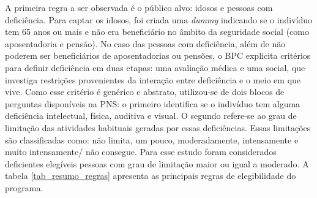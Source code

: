 \documentclass[
	12pt,				%
	openright,			%
	twoside,			%
	a4paper,			%
	english,			%
	french,				%
	spanish,			%
	brazil				%
	]{abntex2}
\begin{document}
	A primeira regra a ser observada é o público alvo: idosos e pessoas com deficiência. Para captar os idosos, foi criada uma \textit{dummy} indicando se o indivíduo tem 65 anos ou mais e não era beneficiário no âmbito da seguridade social (como aposentadoria e pensão). No caso das pessoas com deficiência, além de não poderem ser beneficiários de aposentadorias ou pensões, o BPC explicita critérios para definir deficiência em duas etapas: uma avaliação médica e uma social, que investiga restrições provenientes da interação entre deficiência e o meio em que vive. Como esse critério é genérico e abstrato, utilizou-se de dois blocos de perguntas disponíveis na PNS: o primeiro identifica se o indivíduo tem alguma deficiência intelectual, física, auditiva e visual. O segundo refere-se ao grau de limitação das atividades habituais geradas por essas deficiências. Essas limitações são  classificadas como: não limita, um pouco, moderadamente, intensamente e muito intensamente/ não consegue. Para esse estudo foram considerados deficientes elegíveis pessoas com grau de limitação maior ou igual a moderado. A tabela \ref*{tab_resumo_regras} apresenta as principais regras de elegibilidade do programa.
	
\end{document}
